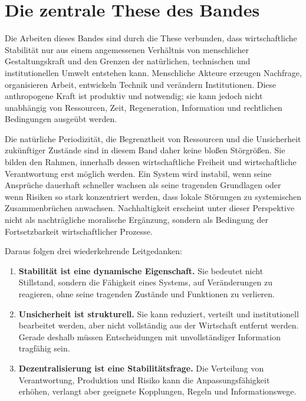 \documentclass[a4paper, 12pt, twoside, openright]{report}
\theoremstyle{definition}
\theoremstyle{definition}
\begin{document}
\section{Die zentrale These des Bandes}

Die Arbeiten dieses Bandes sind durch die These verbunden, dass wirtschaftliche
Stabilität nur aus einem angemessenen Verhältnis von menschlicher Gestaltungskraft
und den Grenzen der natürlichen, technischen und institutionellen Umwelt entstehen
kann. Menschliche Akteure erzeugen Nachfrage, organisieren Arbeit, entwickeln
Technik und verändern Institutionen. Diese anthropogene Kraft ist produktiv und
notwendig; sie kann jedoch nicht unabhängig von Ressourcen, Zeit, Regeneration,
Information und rechtlichen Bedingungen ausgeübt werden.

Die natürliche Periodizität, die Begrenztheit von Ressourcen und die Unsicherheit
zukünftiger Zustände sind in diesem Band daher keine bloßen Störgrößen. Sie bilden
den Rahmen, innerhalb dessen wirtschaftliche Freiheit und wirtschaftliche
Verantwortung erst möglich werden. Ein System wird instabil, wenn seine
Ansprüche dauerhaft schneller wachsen als seine tragenden Grundlagen oder wenn
Risiken so stark konzentriert werden, dass lokale Störungen zu systemischen
Zusammenbrüchen anwachsen. Nachhaltigkeit erscheint unter dieser Perspektive
nicht als nachträgliche moralische Ergänzung, sondern als Bedingung der
Fortsetzbarkeit wirtschaftlicher Prozesse.

Daraus folgen drei wiederkehrende Leitgedanken:

\begin{enumerate}
  \item \textbf{Stabilität ist eine dynamische Eigenschaft.} Sie bedeutet nicht
    Stillstand, sondern die Fähigkeit eines Systems, auf Veränderungen zu
    reagieren, ohne seine tragenden Zustände und Funktionen zu verlieren.
  \item \textbf{Unsicherheit ist strukturell.} Sie kann reduziert, verteilt und
    institutionell bearbeitet werden, aber nicht vollständig aus der
    Wirtschaft entfernt werden. Gerade deshalb müssen Entscheidungen mit
    unvollständiger Information tragfähig sein.
  \item \textbf{Dezentralisierung ist eine Stabilitätsfrage.} Die Verteilung von
    Verantwortung, Produktion und Risiko kann die Anpassungsfähigkeit erhöhen,
    verlangt aber geeignete Kopplungen, Regeln und Informationswege.
\end{enumerate}
\end{document}
